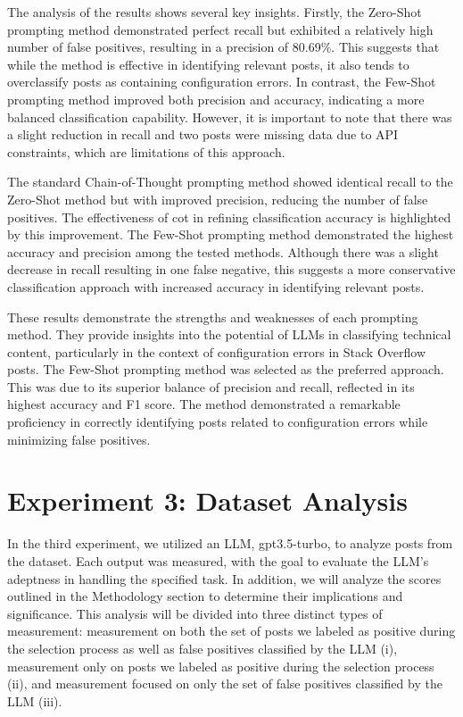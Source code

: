 \documentclass[english,bachelor]{swsLeipzig}
\begin{document}
The analysis of the results shows several key insights. Firstly, the Zero-Shot prompting method 
demonstrated perfect recall but exhibited a relatively high number of false positives, resulting in a precision of 80.69\%. This suggests that while the method is effective in identifying relevant posts, it also tends to overclassify posts as containing configuration errors. In contrast, the Few-Shot prompting method improved both precision and accuracy, indicating a more balanced classification capability. However, it is important to note that there was a slight reduction in recall and two posts were missing data due to API constraints, which are limitations of this approach.

The standard Chain-of-Thought prompting method showed identical recall to the Zero-Shot method but with 
improved precision, reducing the number of false positives. The effectiveness of \gls{cot} in refining classification accuracy is highlighted by this improvement. The Few-Shot prompting method demonstrated the highest accuracy and precision among the tested methods. Although there was a slight decrease in recall resulting in one false negative, this suggests a more conservative classification approach with increased accuracy in identifying relevant posts.

These results demonstrate the strengths and weaknesses of each prompting method. They provide insights 
into the potential of LLMs in classifying technical content, particularly in the context of configuration errors in Stack Overflow posts. The Few-Shot prompting method was selected as the preferred approach. This was due to its superior balance of precision and recall, reflected in its highest accuracy and F1 score. The method demonstrated a remarkable proficiency in correctly identifying posts related to configuration errors while minimizing false positives.

\section{Experiment 3: Dataset Analysis}

In the third experiment, we utilized an LLM, gpt3.5-turbo, to analyze posts from the dataset. Each output was measured, with the goal to evaluate the LLM's adeptness in handling the specified task. In addition, we will analyze the scores outlined in the Methodology section to determine their implications and significance. This analysis will be divided into three distinct types of measurement: measurement on both the set of posts we labeled as positive during the selection process as well as false positives classified by the LLM (i), measurement only on posts we labeled as positive during the selection process (ii), and measurement focused on only the set of false positives classified by the LLM (iii).
\end{document}
